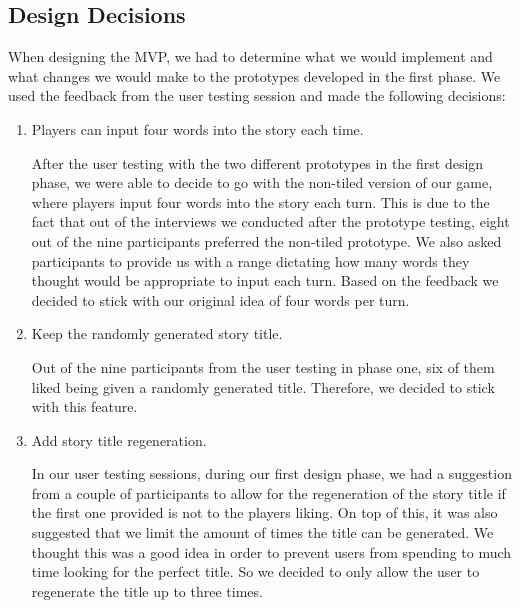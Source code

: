 \documentclass{sigchi}
\begin{document}
\subsection{Design Decisions}
When designing the MVP, we had to determine what we would implement and what changes we would make to the prototypes developed in the first phase. We used the feedback from the user testing session and made the following decisions: 
\begin{enumerate}[leftmargin=.15in,noitemsep]

\item Players can input four words into the story each time.\newline

After the user testing with the two different prototypes in the first design phase, we were able to decide to go with the non-tiled version of our game, where players input four words into the story each turn. This is due to the fact that out of the interviews we conducted after the prototype testing, eight out of the nine participants preferred the non-tiled prototype. We also asked participants to provide us with a range dictating how many words they thought would be appropriate to input each turn. Based on the feedback we decided to stick with our original idea of four words per turn.\newline  

\item Keep the randomly generated story title.\newline

Out of the nine participants from the user testing in phase one, six of them liked being given a randomly generated title. Therefore, we decided to stick with this feature.\newline

\item Add story title regeneration.\newline

In our user testing sessions, during our first design phase, we had a suggestion from a couple of participants to allow for the regeneration of the story title if the first one provided is not to the players liking. On top of this, it was also suggested that we limit the amount of times the title can be generated. We thought this was a good idea in order to prevent users from spending to much time looking for the perfect title. So we decided to only allow the user to regenerate the title up to three times.\newline


\end{enumerate}
\end{document}
